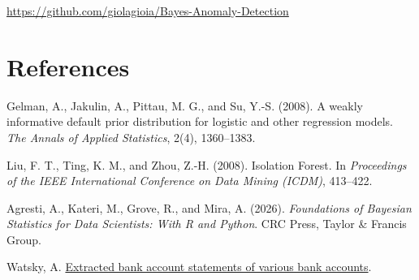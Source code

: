 \documentclass[a4paper,12pt]{article}
\begin{document}
\url{https://github.com/giolagioia/Bayes-Anomaly-Detection}

\section*{References}

Gelman, A., Jakulin, A., Pittau, M. G., and Su, Y.-S. (2008). A weakly informative default prior distribution for logistic and other regression models. \textit{The Annals of Applied Statistics}, 2(4), 1360--1383.

Liu, F. T., Ting, K. M., and Zhou, Z.-H. (2008). Isolation Forest. In \textit{Proceedings of the IEEE International Conference on Data Mining (ICDM)}, 413--422.

Agresti, A., Kateri, M., Grove, R., and Mira, A. (2026). \textit{Foundations of Bayesian Statistics for Data Scientists: With R and Python}. CRC Press, Taylor \& Francis Group.

Watsky, A. \href{https://www.kaggle.com/datasets/apoorvwatsky/bank-transaction-data}{Extracted bank account statements of various bank accounts}.
\end{document}
